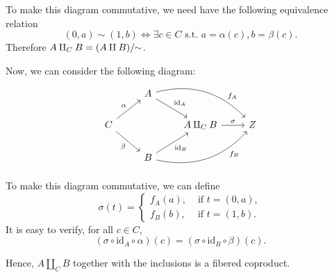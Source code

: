 \begin{solution}
To make this diagram commutative, we need have the following equivalence relation
$$(0, a)\sim (1,b) \iff \exists c\in C \text{ s.t. } a=\alpha(c), b=\beta(c).$$
Therefore $A\amalg_{C} B = (A\amalg B)/\!\!\sim$. 

Now, we can consider the following diagram:
%
\[
\begin{tikzcd}
& A \arrow[dr, "\text{id}_A"] \arrow[drr, bend left, "f_A" near end]& &\\
C  \arrow[ur, "\alpha"] \arrow[dr, "\beta"'] & & A\amalg_{C} B\arrow[r, "\sigma"] & Z\\
& B \arrow[ur, "\text{id}_B"'] \arrow[urr, bend right, "f_B"' near end] & &
\end{tikzcd}
\]

To make this diagram commutative, we can define 
$$\sigma(t) = \begin{cases}
	f_A(a), &\text{ if } t=(0,a),\\
	f_B(b), &\text{ if } t=(1,b).
\end{cases}$$
It is easy to verify, for all $c\in C$, 
$$(\sigma\circ \text{id}_A\circ \alpha)(c) = (\sigma\circ \text{id}_B\circ \beta)(c).$$

Hence, $A\amalg_{C} B$ together with the inclusions is a fibered coproduct.
\end{solution}




























